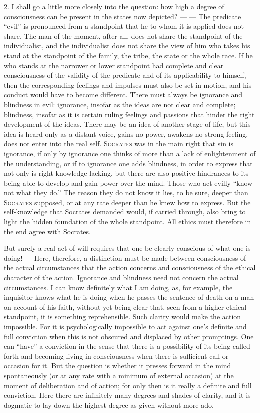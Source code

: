 \documentclass[12pt,a4paper,openany]{book}
\newcommand{\opage}[1]{\marginnote{\footnotesize\textit{[#1]}}}
\begin{document}
2. I shall go a little more closely into the question: how high a degree of consciousness can be present
in the states now depicted? --- --- The predicate ``evil'' is pronounced from a standpoint that he to whom
it is applied does not share. The man of the moment, after all, does not share the standpoint of the
individualist, and the individualist does not share the view of him who takes his stand at the standpoint
of the family, the tribe, the state or the whole race. If
\opage{132}he who stands at the narrower or lower standpoint had complete and clear consciousness of the validity
of the predicate and of its applicability to himself, then the corresponding feelings and impulses must
also be set in motion, and his conduct would have to become different. There must always be ignorance and
blindness in evil: ignorance, insofar as the ideas are not clear and complete; blindness, insofar as it is
certain ruling feelings and passions that hinder the right development of the ideas. There may be an idea
of another stage of life, but this idea is heard only as a distant voice, gains no power, awakens no
strong feeling, does not enter into the real self. \textsc{Socrates} was in the main right that sin is
ignorance, if only by ignorance one thinks of more than a lack of enlightenment of the understanding, or
if to ignorance one adds blindness, in order to express that not only is right knowledge lacking, but
there are also positive hindrances to its being able to develop and gain power over the mind. Those who
act evilly ``know not what they do.'' The reason they do not know it lies, to be sure, deeper than
\textsc{Socrates} supposed, or at any rate deeper than he knew how to express. But the self-knowledge that
Socrates demanded would, if carried through, also bring to light the hidden foundation of the whole
standpoint. All ethics must therefore in the end agree with Socrates.

But surely a real act of will requires that one be clearly conscious of what one is doing! --- Here,
therefore, a distinction must be made between consciousness of the actual circumstances that the action
concerns and consciousness of the ethical character of the action. Ignorance and blindness need not
concern the actual circumstances. I can know definitely what I am doing, as, for example, the inquisitor
knows what he is doing when he passes the sentence of death on a man on account of his faith, without yet
being clear that, seen from a higher ethical standpoint, it is something reprehensible. Such clarity would
make the action impossible. For it is psychologically impossible to act against one's definite and full
conviction when this is not obscured and displaced by other promptings. One can ``have'' a conviction
\opage{133}in the sense that there is a possibility of its being called forth and becoming living in
consciousness when there is sufficient call or occasion for it. But the question is whether it presses
forward in the mind spontaneously (or at any rate with a minimum of external occasion) at the moment of
deliberation and of action; for only then is it really a definite and full conviction. Here there are
infinitely many degrees and shades of clarity, and it is dogmatic to lay down the highest degree as given
without more ado.
\end{document}
